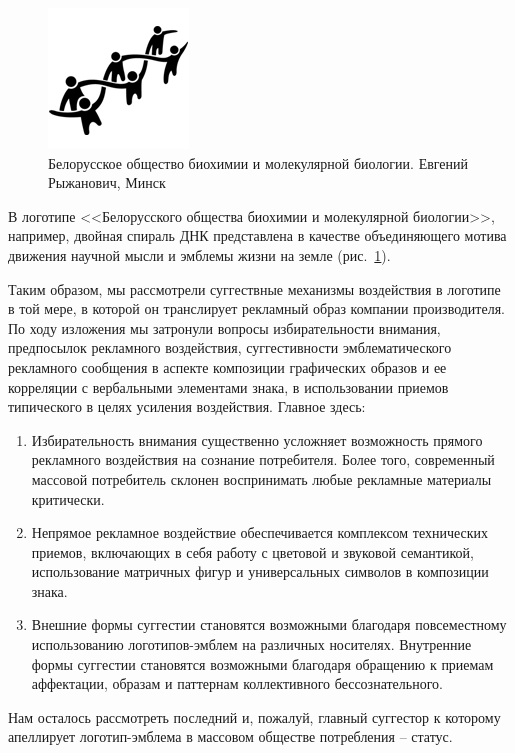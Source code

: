 \begin{enumerate}
 \begin{figure}[h!]
  \centering
  \includegraphics[width=.3\linewidth]{images/biochem}
  \caption{Белорусское общество биохимии и молекулярной биологии. Евгений Рыжанович, Минск}
  \label{fig:biochem}
\end{figure}

   В логотипе <<Белорусского общества биохимии и молекулярной биологии>>,
  например, двойная спираль ДНК представлена в качестве объединяющего мотива
  движения научной мысли и эмблемы жизни на земле (рис.~\ref{fig:biochem}).
\end{enumerate}

Таким образом, мы рассмотрели суггествные механизмы воздействия в логотипе в
той мере, в которой он транслирует рекламный образ компании производителя. По
ходу изложения мы затронули вопросы избирательности внимания, предпосылок рекламного
воздействия, суггестивности эмблематического рекламного сообщения в аспекте
композиции графических образов и ее корреляции с вербальными элементами знака,
в использовании приемов типического в целях усиления воздействия. Главное здесь:
\begin{enumerate}
\item Избирательность внимания существенно усложняет возможность прямого
  рекламного воздействия на сознание потребителя. Более того, современный
  массовой потребитель склонен воспринимать любые рекламные материалы
  критически.
\item Непрямое рекламное воздействие обеспечивается комплексом технических
  приемов, включающих в себя работу с цветовой и звуковой семантикой,
  использование матричных фигур и универсальных символов в композиции
  знака.
\item Внешние формы суггестии становятся возможными благодаря повсеместному
  использованию логотипов-эмблем на различных носителях. Внутренние формы
  суггестии становятся возможными благодаря обращению к приемам аффектации,
  образам и паттернам коллективного бессознательного.
\end{enumerate}

Нам осталось рассмотреть последний и, пожалуй, главный суггестор к которому
апеллирует логотип-эмблема в массовом обществе потребления -- статус.

